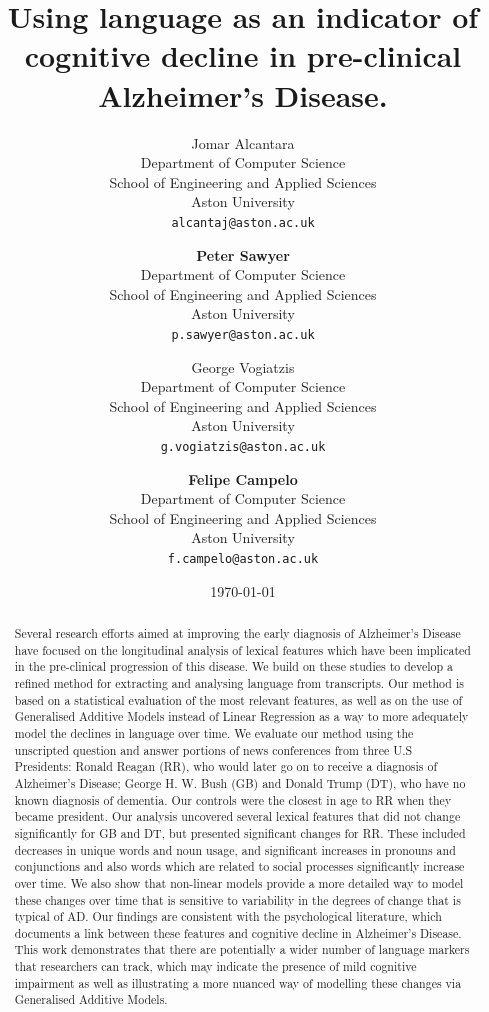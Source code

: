 \documentclass[12pt]{article}
\title{Using language as an indicator of cognitive decline in pre-clinical Alzheimer's Disease.}
\author{
	Jomar Alcantara \\
	Department of Computer Science\\
	School of Engineering and Applied Sciences\\
	Aston University\\
	\texttt{alcantaj@aston.ac.uk} \\
		\and
	\textbf{Peter Sawyer} \\
	Department of Computer Science\\
	School of Engineering and Applied Sciences\\
	Aston University\\
	\texttt{p.sawyer@aston.ac.uk} \\
		\and
	George Vogiatzis\\
	Department of Computer Science\\
	School of Engineering and Applied Sciences\\
	Aston University \\
	\texttt{g.vogiatzis@aston.ac.uk} \\
		\and
	\textbf{Felipe Campelo}\\
	Department of Computer Science\\
	School of Engineering and Applied Sciences\\
	Aston University\\
	\texttt{f.campelo@aston.ac.uk}
}
\date{\today}
\begin{document}
\bigskip
\begin{abstract}
Several research efforts aimed at improving the early diagnosis of Alzheimer's Disease have focused on the longitudinal analysis of lexical features which have been implicated in the pre-clinical progression of this disease. We build on these studies to develop a refined method for extracting and analysing language from transcripts. Our method is based on a statistical evaluation of the most relevant features, as well as on the use of Generalised Additive Models instead of Linear Regression as a way to more adequately model the declines in language over time. We evaluate our method using the unscripted question and answer portions of news conferences from three U.S Presidents: Ronald Reagan (RR), who would later go on to receive a diagnosis of Alzheimer's Disease; George H. W. Bush (GB) and Donald Trump (DT), who have no known diagnosis of dementia. Our controls were the closest in age to RR when they became president. Our analysis uncovered several lexical features that did not change significantly for GB and DT, but presented significant changes for RR. These included decreases in unique words and noun usage, and significant increases in pronouns and conjunctions and also words which are related to social processes significantly increase over time. We also show that non-linear models provide a more detailed way to model these changes over time that is sensitive to variability in the degrees of change that is typical of AD. Our findings are consistent with the psychological literature, which documents a link between these features and cognitive decline in Alzheimer's Disease. This work demonstrates that there are potentially a wider number of language markers that researchers can track, which may indicate the presence of mild cognitive impairment as well as illustrating a more nuanced way of modelling these changes via Generalised Additive Models.
\end{abstract}

\maketitle
\end{document}
